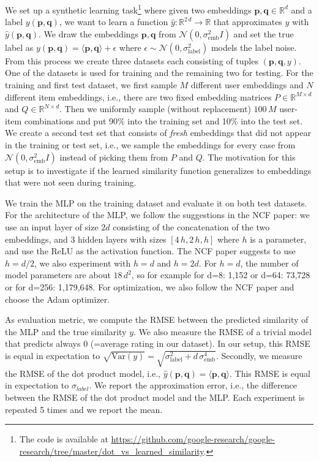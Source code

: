 \documentclass{article}
\newcommand{\N}{\mathcal{N}}
\newcommand{\Embu}{P}
\newcommand{\Embi}{Q}
\newcommand{\embu}{\mathbf{p}}
\newcommand{\embi}{\mathbf{q}}
\begin{document}
We set up a synthetic learning task\footnote{The code is available at \url{https://github.com/google-research/google-research/tree/master/dot_vs_learned_similarity}.} where given two embeddings $\embu, \embi \in \mathbb{R}^d$ and a label $y(\embu, \embi)$, we want to learn a function  $\hat{y}: \mathbb{R}^{2\,d} \to \mathbb{R}$ that approximates $y$ with $\hat{y}(\embu,\embi)$.
We draw the embeddings $\embu, \embi$ from $\N(0,\sigma_{\text{emb}}^2 I)$ and set the true label as $y(\embu, \embi) = \langle \embu, \embi \rangle + \epsilon$ where $\epsilon \sim \N(0,\sigma_{\text{label}}^2)$ models the label noise.
From this process we create three datasets each consisting of tuples $(\embu, \embi, y)$.
One of the datasets is used for training and the remaining two for testing.
For the training and first test dataset, we first sample $M$ different user embeddings and $N$ different item embeddings, i.e., there are two fixed embedding matrices $\Embu \in \mathbb{R}^{M \times d}$ and $\Embi \in \mathbb{R}^{N \times d}$.
Then we uniformly sample (without replacement) $100 \, M$ user-item combinations and put 90\% into the training set and 10\% into the test set.
We create a second test set that consists of \emph{fresh} embeddings that did not appear in the training or test set, i.e., we sample the embeddings for every case from $\mathcal{N}(0,\sigma^2_\text{emb} I)$ instead of picking them from $\Embu$ and $\Embi$.
The motivation for this setup is to investigate if the learned similarity function generalizes to embeddings that were not seen during training.

We train the MLP on the training dataset and evaluate it on both test datasets. For the architecture of the MLP, we follow the suggestions in the NCF paper: we use an input layer of size $2d$ consisting of the concatenation of the two embeddings, and 3 hidden layers with sizes $[4\,h,2\,h,h]$ where $h$ is a parameter, and use the ReLU as the activation function.
The NCF paper suggests to use $h=d/2$, we also experiment with $h=d$ and $h=2d$.
For $h=d$, the number of model parameters are about $18\,d^2$, so for example for d=8: 1,152 or d=64: 73,728 or for d=256: 1,179,648.
For optimization, we also follow the NCF paper and choose the Adam optimizer.

As evaluation metric, we compute the RMSE between the predicted similarity of the MLP and the true similarity $y$.
We also measure the RMSE of a trivial model that predicts always 0 (=average rating in our dataset).
In our setup, this RMSE is equal in expectation to $\sqrt{\text{Var}(y)}=\sqrt{\sigma_{\text{label}}^2 + d\,\sigma_{\text{emb}}^4}$.
Secondly, we measure the RMSE of the dot product model, i.e., $\hat{y}(\embu, \embi)=\langle \embu, \embi \rangle$.
This RMSE is equal in expectation to $\sigma_{label}$.
We report the approximation error, i.e., the difference between the RMSE of the dot product model and the MLP.
Each experiment is repeated 5 times and we report the mean.
\end{document}

